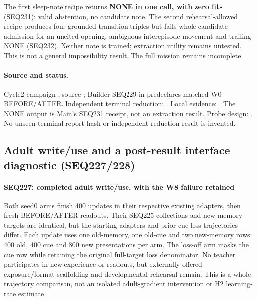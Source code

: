 \documentclass[11pt]{article}
\begin{document}
The first sleep-note recipe returns \textbf{NONE in one call, with zero fits}
(SEQ231): valid abstention, no candidate note. The second rehearsal-allowed
recipe produces four grounded transition triples but fails whole-candidate
admission for an uncited opening, ambiguous interepisode movement and trailing
NONE (SEQ232). Neither note is trained; extraction utility remains untested.
This is not a general impossibility result. The full mission remains incomplete.

\paragraph{Source and status.}
Cycle2 campaign ,
source ; Builder SEQ229 in 
predeclares matched W0 BEFORE/AFTER. Independent terminal reduction:
.
Local evidence: .
The NONE output is Main's SEQ231 receipt, not an extraction result. Probe design:
.
No unseen terminal-report hash or independent-reduction result is invented.

\subsection{Adult write/use and a post-result interface diagnostic (SEQ227/228)}
\label{sec:adult227}
\paragraph{SEQ227: completed adult write/use, with the W8 failure retained}

Both seed0 arms finish 400 updates in their respective existing adapters, then
fresh BEFORE/AFTER readouts. Their SEQ225 collections and new-memory targets
are identical, but the starting adapters and prior cue-loss trajectories differ.
Each update uses one old-memory, one old-cue and two new-memory rows: 400 old,
400 cue and 800 new presentations per arm. The loss-off arm masks the cue row
while retaining the original full-target loss denominator. No teacher participates
in new experience or readouts, but externally offered exposure/format scaffolding
and developmental rehearsal remain. This is a whole-trajectory comparison,
not an isolated adult-gradient intervention or H2 learning-rate estimate.
\end{document}
